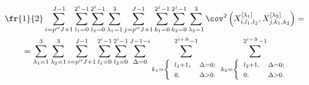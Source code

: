 \begin{multline*}


\fr{1}{2} \sum\limits_{i = p''J + 1}^{J - 1}


\sum\limits_{l_1 = 0}^{2^i - 1} \sum\limits_{l_2 = 0}^{2^i - 1}


\sum\limits_{\lambda_1=1}^3 \sum\limits_{j = p''J + 1}^{J - 1}


\sum\limits_{k_1 = 0}^{2^j - 1} \sum\limits_{k_2 = 0}^{2^j - 1}


\sum\limits_{\lambda_2=1}^3


\cov^2\left(X_{i,l_1,l_2}^{[\lambda_1]}, X_{j,k_1,k_2}^{[\lambda_2]}\right)=


{}\\


{}=\sum\limits_{\lambda_1=1}^3\sum\limits_{\lambda_2=1}^3


\sum\limits_{i = p''J + 1}^{J - 1} \sum\limits_{l_1 = 0}^{2^i - 1}


\sum\limits_{l_2 = 0}^{2^i - 1} \sum\limits_{\Delta = 0}^{J - 1 - i}


{\sum\limits^{2^{i+\Delta} - 1}_{k_1 = %


\left\{


\begin{array}{ll} %


{\scriptstyle l_1 + 1}, & {\scriptstyle \Delta = 0;} \\


{\scriptstyle 0,} & {\scriptstyle \Delta > 0.}


\end{array}\right.




}}


{\sum\limits^{2^{i+\Delta} - 1}_{k_2 =  %


\left\{  %


\begin{array}{ll}


{\scriptstyle l_2 + 1,} & {\scriptstyle \Delta = 0;} \\


{\scriptstyle 0,} & {\scriptstyle \Delta > 0.}


\end{array}


\right.




}}
\end{multline*}
